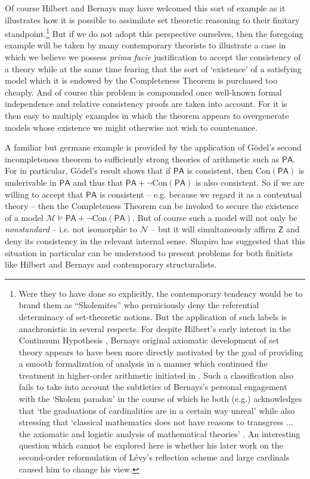 \documentclass[11pt,fleqn,leqno]{article}
\begin{document}
Of course Hilbert and Bernays may have welcomed this sort of example as it illustrates how it is possible to assimilate set theoretic reasoning to their finitary standpoint.\footnote{Were they to have done so explicitly, the contemporary tendency would be to brand them as ``Skolemites'' who perniciously deny the referential determinacy of set-theoretic notions.  But the application of such labels is anachronistic in several respects.  For despite Hilbert's early interest in the Continuum Hypothesis \citeyearpar{Hilbert1900,Hilbert1925},  Bernays original axiomatic development of set theory appears to have been more directly motivated by the goal of providing a smooth formalization of analysis in a manner which continued the treatment in higher-order arithmetic initiated in \citeyearpar[Sup. IV]{Hilbert1939}. Such a classification also fails to take into account the subtleties of Bernays's personal engagement  with the `Skolem paradox' in the course of which he both (e.g.) acknowledges that `the graduations of cardinalities are in a certain way unreal' while also stressing that `classical mathematics does not have reasons to transgress $\ldots$ the axiomatic and logistic analysis of mathematical theories' \citeyearpar[p. 117]{Bernays1957}.  An interesting question which cannot be explored here is whether his later work \citeyearpar{Bernays1976d} on the second-order reformulation of L\'evy's reflection scheme and large cardinals caused him to change his view.}    But if we do not adopt this perspective ourselves, then the foregoing example will be taken by many contemporary theorists to illustrate a case in which we believe we possess \textsl{prima facie} justification to accept the consistency of a theory while at the same time fearing that the sort of `existence' of a satisfying model which it is endowed by the Completeness Theorem is purchased too cheaply.   And of course this problem is compounded once  well-known formal independence and relative consistency proofs are taken into account.  For it is then easy to multiply examples in which the theorem appears to overgenerate models whose existence we might otherwise not wish to countenance.

A familiar but germane example is provided by the application of G\"odel's second incompleteness theorem to sufficiently strong theories of arithmetic such as $\mathsf{PA}$.   For in particular,  G\"odel's result shows that if $\mathsf{PA}$ is consistent, then $\mathrm{Con}(\mathsf{PA})$  is underivable in $\mathsf{PA}$ and thus that $\mathsf{PA} + \neg \mathrm{Con}(\mathsf{PA})$ is also consistent.   So if we are willing to accept that $\mathsf{PA}$ is consistent -- e.g. because we regard it as a contentual theory -- then the Completeness Theorem can be invoked to secure the existence of a model $\mathcal{M} \models \mathsf{PA} + \neg \mathrm{Con}(\mathsf{PA})$.   But of course such a model will not only be \textsl{nonstandard} -- i.e. not isomorphic to $\mathcal{N}$ -- but it will simultaneously affirm $\mathsf{Z}$ and deny its consistency in the relevant internal sense.  Shapiro has suggested that this situation in particular can be understood to present problems for both finitists like Hilbert and Bernays and contemporary structuralists.     
\end{document}
